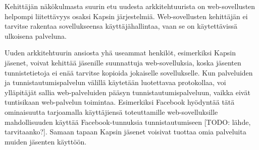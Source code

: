 Kehittäjän näkökulmasta suurin etu uudesta arkkitehtuurista on web-sovellusten helpompi liitettävyys osaksi Kapsin järjestelmiä. Web-sovellusten kehittäjän ei tarvitse rakentaa sovellukseensa käyttäjähallintaa, vaan se on käytettävissä ulkoisena palveluna.

Uuden arkkitehtuurin ansiosta yhä useammat henkilöt, esimerkiksi Kapsin jäsenet, voivat kehittää jäsenille suunnattuja web-sovelluksia, koska jäsenten tunnistetietoja ei enää tarvitse kopioida jokaiselle sovellukselle. Kun palveluiden ja tunnistautumispalvelun välillä käytetään luotettavaa protokollaa, voi ylläpitäjät sallia web-palveluiden pääsyn tunnistautumispalveluun, vaikka eivät tuntisikaan web-palvelun toimintaa. Esimerkiksi Facebook hyödyntää tätä ominaisuutta tarjoamalla käyttäjiensä toteuttamille web-sovelluksille mahdollisuuden käyttää Facebook-tunnuksia tunnistautumiseen [TODO: lähde, tarvitaanko?]. Samaan tapaan Kapsin jäsenet voisivat tuottaa omia palveluita muiden jäsenten käyttöön.